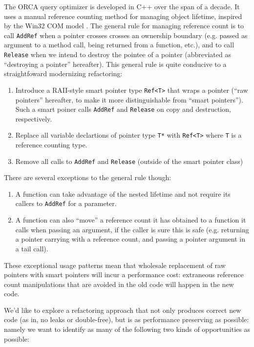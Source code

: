 \documentclass[sigplan,anonymous,review]{acmart}
\newcommand{\AR}{\lstinline{AddRef}}
\newcommand{\R}{\lstinline{Release}}
\begin{document}
The ORCA query optimizer is developed in C++ over the span of a decade.
It uses a manual reference counting method for managing object lifetime,
inspired by the Win32 COM model \cite{COMRefCount}.
The general rule for managing reference count is to call \AR{} when a pointer crosses crosses an ownership boundary (e.g. passed as argument to a method call, being returned from a function, etc.), and to call \R{} when we intend to destroy the pointee of a pointer (abbreviated as ``destroying a pointer'' hereafter).
This general rule is quite conducive to a straightfoward modernizing refactoring:
\begin{enumerate}
	\item Introduce a RAII-style smart pointer type \lstinline{Ref<T>} that wraps a pointer (``raw pointers'' hereafter, to make it more distinguishable from ``smart pointers''). Such a smart poiner calls \AR{} and \R{} on copy and destruction, respectively.
	\item Replace all variable declartions of pointer type \lstinline{T*} with \lstinline{Ref<T>} where \lstinline{T} is a reference counting type.
	\item Remove all calls to \AR{} and \R{} (outside of the smart pointer class)
\end{enumerate}

There are several exceptions to the general rule though:
\begin{enumerate}
	\item A function can take advantage of the nested lifetime and not require its callers to \AR{} for a parameter.
	\item A function can also ``move'' a reference count it has obtained to a function it calls when passing an argument, if the caller is sure this is safe (e.g. returning a pointer carrying with a reference count, and passing a pointer argument in a tail call).
\end{enumerate}

These exceptional usage patterns mean that wholesale replacement of raw pointers with smart pointers will incur a performance cost: extraneous reference count manipulations that are avoided in the old code will happen in the new code.

We'd like to explore a refactoring approach that not only produces correct new code (as in, no leaks or double-free), but is as performance preserving as possible: namely we want to identify as many of the following two kinds of opportunities as possible:
\end{document}
